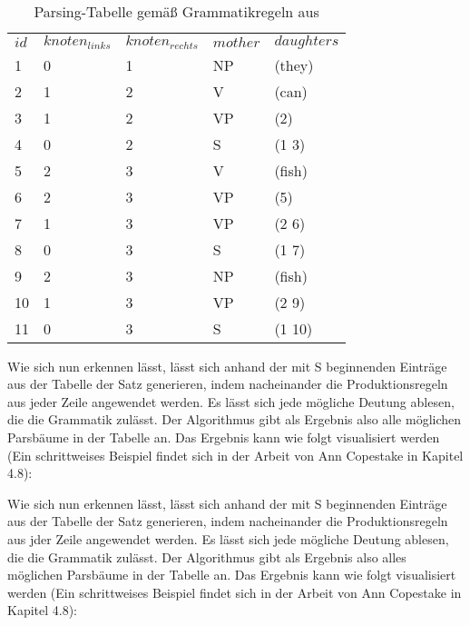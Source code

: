 \documentclass[12pt]{paper}
\begin{document}
\begin{table}
\tt
\begin{tabular}{lllll}
$id$ & $knoten_{links}$ & $knoten_{rechts}$ & $mother$ & $daughters$ \\
1    & 0                & 1                 & NP       & (they)      \\
2    & 1                & 2                 & V        & (can)       \\
3    & 1                & 2                 & VP       & (2)         \\
4    & 0                & 2                 & S        & (1 3)       \\
5    & 2                & 3                 & V        & (fish)      \\
6    & 2                & 3                 & VP       & (5)         \\
7    & 1                & 3                 & VP       & (2 6)       \\
8    & 0                & 3                 & S        & (1 7)       \\
9    & 2                & 3                 & NP       & (fish)      \\
10   & 1                & 3                 & VP       & (2 9)       \\
11   & 0                & 3                 & S        & (1 10)     
\end{tabular}
\rm
\caption{Parsing-Tabelle gemäß Grammatikregeln aus \cite{cop04}}

Wie sich nun erkennen lässt, lässt sich anhand der mit S beginnenden Einträge aus der Tabelle der Satz generieren, indem nacheinander die Produktionsregeln aus jeder Zeile angewendet werden. Es lässt sich jede mögliche Deutung ablesen, die die Grammatik zulässt. Der Algorithmus gibt als Ergebnis also alle möglichen Parsbäume in der Tabelle an. Das Ergebnis kann wie folgt visualisiert werden (Ein schrittweises Beispiel findet sich in der Arbeit von Ann Copestake in Kapitel 4.8):

Wie sich nun erkennen lässt, lässt sich anhand der mit S beginnenden Einträge aus der Tabelle der Satz generieren, indem nacheinander die Produktionsregeln aus jder Zeile angewendet werden. Es lässt sich jede mögliche Deutung ablesen, die die Grammatik zulässt. Der Algorithmus gibt als Ergebnis also alles möglichen Parsbäume in der Tabelle an. Das Ergebnis kann wie folgt visualisiert werden (Ein schrittweises Beispiel findet sich in der Arbeit von Ann Copestake in Kapitel 4.8):


\end{table}
\end{document}
